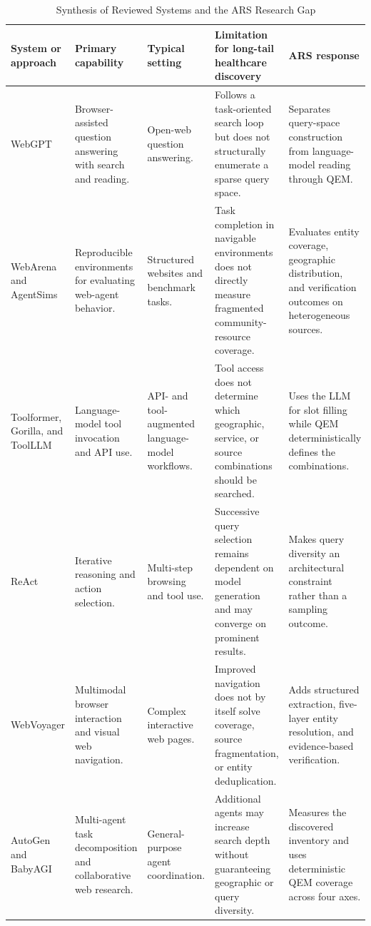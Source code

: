 \documentclass[12pt,oneside]{report}
\renewcommand{\arraystretch}{1.15}
\begin{document}
\begin{table}[htbp]
\caption{Synthesis of Reviewed Systems and the ARS Research Gap}
\label{tab:literature_synthesis}
\centering
\small
\renewcommand{\arraystretch}{1.25}
\begin{tabularx}{\textwidth}{@{}p{2.2cm} X X X X@{}}
\toprule
\textbf{System or approach} & \textbf{Primary capability} & \textbf{Typical setting} & \textbf{Limitation for long-tail healthcare discovery} & \textbf{ARS response} \\
\midrule
WebGPT \cite{10} & Browser-assisted question answering with search and reading. & Open-web question answering. & Follows a task-oriented search loop but does not structurally enumerate a sparse query space. & Separates query-space construction from language-model reading through QEM. \\
WebArena and AgentSims \cite{11,12} & Reproducible environments for evaluating web-agent behavior. & Structured websites and benchmark tasks. & Task completion in navigable environments does not directly measure fragmented community-resource coverage. & Evaluates entity coverage, geographic distribution, and verification outcomes on heterogeneous sources. \\
Toolformer, Gorilla, and ToolLLM \cite{13,14,8} & Language-model tool invocation and API use. & API- and tool-augmented language-model workflows. & Tool access does not determine which geographic, service, or source combinations should be searched. & Uses the LLM for slot filling while QEM deterministically defines the combinations. \\
ReAct \cite{15} & Iterative reasoning and action selection. & Multi-step browsing and tool use. & Successive query selection remains dependent on model generation and may converge on prominent results. & Makes query diversity an architectural constraint rather than a sampling outcome. \\
WebVoyager \cite{18} & Multimodal browser interaction and visual web navigation. & Complex interactive web pages. & Improved navigation does not by itself solve coverage, source fragmentation, or entity deduplication. & Adds structured extraction, five-layer entity resolution, and evidence-based verification. \\
AutoGen and BabyAGI \cite{19,20} & Multi-agent task decomposition and collaborative web research. & General-purpose agent coordination. & Additional agents may increase search depth without guaranteeing geographic or query diversity. & Measures the discovered inventory and uses deterministic QEM coverage across four axes. \\

\end{tabularx}
\end{table}
\end{document}
